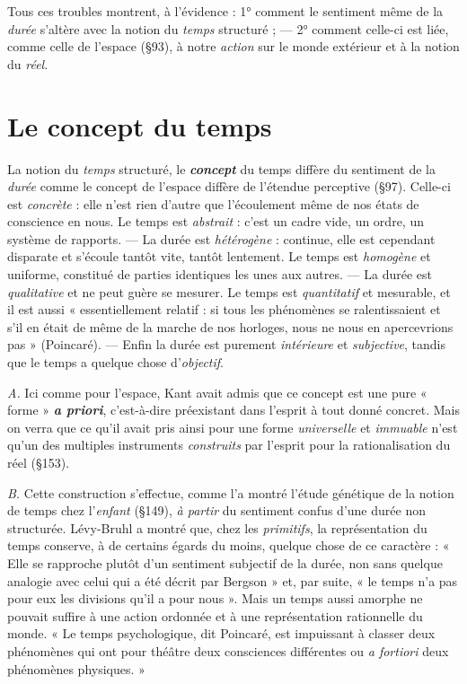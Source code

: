 Tous ces troubles montrent, à l’évidence : 1° comment le sentiment
même de la {\it durée} s’altère avec la notion du {\it temps} structuré ; —
2° comment celle-ci est liée, comme celle de l’espace (\S 93), à notre
{\it action} sur le monde extérieur et à la notion du {\it réel}.

\section{Le concept du temps}%
La notion du {\it temps} structuré, le
\textbf{\textit {concept}} du temps diffère du sentiment de la
{\it durée} comme le concept
de l’espace diffère de l’étendue perceptive (\S 97). Celle-ci est {\it concrète} :
elle n’est rien d’autre que l’écoulement même de nos états de conscience
en nous. Le temps est {\it abstrait} : c’est un cadre vide, un ordre,
un système de rapports. — La durée est {\it hétérogène} : continue, elle
est cependant disparate et s’écoule tantôt vite, tantôt lentement. Le
temps est {\it homogène} et uniforme, constitué de parties identiques les
unes aux autres. — La durée est {\it qualitative} et ne peut guère se
mesurer. Le temps est {\it quantitatif} et mesurable, et il est aussi
« essentiellement
relatif : si tous les phénomènes se ralentissaient et s’il en
était de même de la marche de nos horloges, nous ne nous en apercevrions
pas » (Poincaré). — Enfin la durée est purement {\it intérieure} et
{\it subjective}, tandis que le temps a quelque chose d'{\it objectif}.

{\it A.} Ici comme pour l’espace, Kant avait admis que ce concept est
une pure « forme » \textbf{\textit {a priori}},
c’est-à-dire préexistant dans l'esprit à
tout donné concret. Mais on verra que ce qu’il avait pris ainsi pour une
forme {\it universelle} et {\it immuable} n’est qu’un des multiples instruments
{\it construits} par l'esprit pour la rationalisation du réel (\S 153).

{\it B.} Cette construction s'effectue, comme l’a montré l’étude génétique
de la notion de temps chez l’{\it enfant} (\S 149), {\it à partir} du sentiment
confus d’une durée non structurée. Lévy-Bruhl a montré que, chez
les {\it primitifs}, la représentation du temps conserve, à de certains égards
du moins, quelque chose de ce caractère : « Elle se rapproche plutôt
d’un sentiment subjectif de la durée, non sans quelque analogie avec
celui qui a été décrit par Bergson » et, par suite, « le temps n’a pas
pour eux les divisions qu’il a pour nous ». Mais un temps aussi amorphe
ne pouvait suffire à une action ordonnée et à une représentation
rationnelle du monde. « Le temps psychologique, dit Poincaré, est
impuissant à classer deux phénomènes qui ont pour théâtre deux consciences
différentes ou {\it a fortiori} deux phénomènes physiques. »

